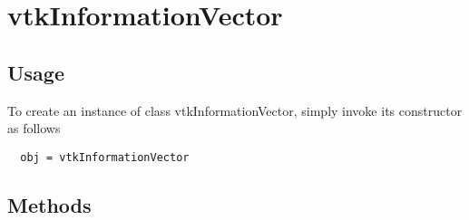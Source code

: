 \section{vtkInformationVector}

\subsection{Usage}


To create an instance of class vtkInformationVector, simply
invoke its constructor as follows
\begin{verbatim}
  obj = vtkInformationVector
\end{verbatim}
\subsection{Methods}

